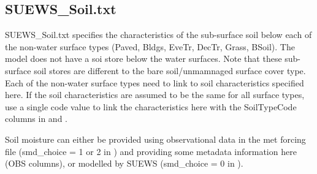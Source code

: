 \documentclass[letterpaper,10pt,english]{sphinxmanual}
\begin{document}
\subsection{SUEWS\_Soil.txt}
\label{\detokenize{input_files/SUEWS_SiteInfo/SUEWS_Soil:suews-soil-txt}}\label{\detokenize{input_files/SUEWS_SiteInfo/SUEWS_Soil::doc}}\label{\detokenize{input_files/SUEWS_SiteInfo/SUEWS_Soil:id1}}
SUEWS\_Soil.txt specifies the characteristics of the sub-surface soil
below each of the non-water surface types (Paved, Bldgs, EveTr, DecTr,
Grass, BSoil). The model does not have a soi store below the water
surfaces. Note that these sub-surface soil stores are different to the
bare soil/unmamnaged surface cover type. Each of the non-water surface
types need to link to soil characteristics specified here. If the soil
characteristics are assumed to be the same for all surface types, use a
single code value to link the characteristics here with the SoilTypeCode
columns in {\hyperref[\detokenize{input_files/SUEWS_SiteInfo/SUEWS_NonVeg:suews-nonveg-txt}]{}} and {\hyperref[\detokenize{input_files/SUEWS_SiteInfo/SUEWS_Veg:suews-veg-txt}]{}}.

Soil moisture can either be provided using observational data in the met
forcing file (smd\_choice = 1 or 2 in
{\hyperref[\detokenize{input_files/RunControl/RunControl:runcontrol-nml}]{}}) and providing some metadata
information here (OBS columns), or modelled by SUEWS (smd\_choice = 0
in {\hyperref[\detokenize{input_files/RunControl/RunControl:runcontrol-nml}]{}}). 
\end{document}
